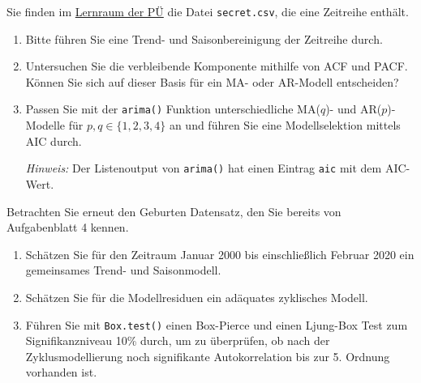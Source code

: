

Sie finden im \href{https://moodle.uni-bielefeld.de/course/view.php?id=1035}{Lernraum der PÜ} die Datei \texttt{secret.csv}, die eine Zeitreihe enthält.

\begin{enumerate}

\item Bitte führen Sie eine Trend- und Saisonbereinigung der Zeitreihe durch.


\item Untersuchen Sie die verbleibende Komponente mithilfe von ACF und PACF. Können Sie sich auf dieser Basis für ein MA- oder AR-Modell entscheiden?


\item Passen Sie mit der \texttt{arima()} Funktion unterschiedliche MA($q$)- und AR($p$)-Modelle für $p,q \in \{1,2,3,4\}$ an und führen Sie eine Modellselektion mittels AIC durch. 

\emph{Hinweis:} Der Listenoutput von \texttt{arima()} hat einen Eintrag \texttt{aic} mit dem AIC-Wert.
\end{enumerate}



Betrachten Sie erneut den Geburten Datensatz, den Sie bereits von Aufgabenblatt 4 kennen.

\begin{enumerate}

\item Schätzen Sie für den Zeitraum Januar 2000 bis einschließlich Februar 2020 ein gemeinsames Trend- und Saisonmodell.

 
\item Schätzen Sie für die Modellresiduen ein adäquates zyklisches Modell.


\item Führen Sie mit \texttt{Box.test()} einen Box-Pierce und einen Ljung-Box Test zum Signifikanzniveau 10\% durch, um zu überprüfen, ob nach der Zyklusmodellierung noch signifikante Autokorrelation bis zur 5. Ordnung vorhanden ist.


\end{enumerate}

